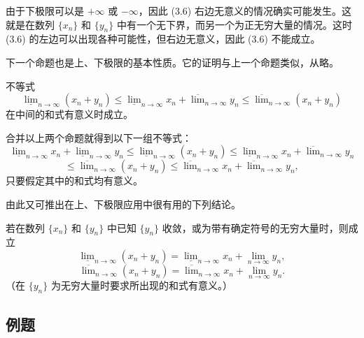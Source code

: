 \begin{xremark}
由于下极限可以是 $+\infty$ 或 $-\infty$，因此 (3.6) 右边无意义的情况确实可能发生。这就是在数列 $\{x_n\}$ 和 $\{y_n\}$ 中有一个无下界，而另一个为正无穷大量的情况。这时 (3.6) 的左边可以出现各种可能性，但右边无意义，因此 (3.6) 不能成立。
\end{xremark}

下一个命题也是上、下极限的基本性质。它的证明与上一个命题类似，从略。

\begin{xproposition}[3.6.5]
不等式
\[
  \underline{\lim}_{n\to\infty}(x_n+y_n)
  \leqslant\underline{\lim}_{n\to\infty}x_n
  +\overline{\lim}_{n\to\infty}y_n
  \leqslant\overline{\lim}_{n\to\infty}(x_n+y_n)
\]
在中间的和式有意义时成立。
\end{xproposition}

\begin{xremark}
合并以上两个命题就得到以下一组不等式：
\[
  \underline{\lim}_{n\to\infty}x_n+\underline{\lim}_{n\to\infty}y_n
  \leqslant\underline{\lim}_{n\to\infty}(x_n+y_n)
  \leqslant\underline{\lim}_{n\to\infty}x_n+\overline{\lim}_{n\to\infty}y_n
\]
\[
  \leqslant\overline{\lim}_{n\to\infty}(x_n+y_n)
  \leqslant\overline{\lim}_{n\to\infty}x_n+\overline{\lim}_{n\to\infty}y_n,
\]
只要假定其中的和式均有意义。
\end{xremark}

由此又可推出在上、下极限应用中很有用的下列结论。

\begin{xproposition}[3.6.6]
若在数列 $\{x_n\}$ 和 $\{y_n\}$ 中已知 $\{y_n\}$ 收敛，或为带有确定符号的无穷大量时，则成立
\[
  \underline{\lim}_{n\to\infty}(x_n+y_n)
  =\underline{\lim}_{n\to\infty}x_n+\lim_{n\to\infty}y_n,
\]
\[
  \overline{\lim}_{n\to\infty}(x_n+y_n)
  =\overline{\lim}_{n\to\infty}x_n+\lim_{n\to\infty}y_n.
\]
（在 $\{y_n\}$ 为无穷大量时要求所出现的和式有意义。）
\end{xproposition}

\subsection{例题}

